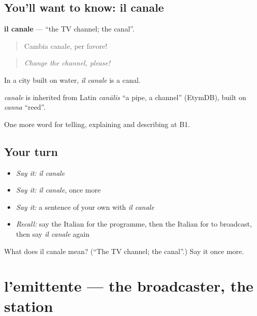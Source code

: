 \subsection*{You'll want to know: il canale}
\textbf{il canale} — \textquotedblleft{}the TV channel; the canal\textquotedblright{}.

\begin{quote}
Cambia canale, per favore!
\end{quote}

\begin{quote}
\emph{Change the channel, please!}
\end{quote}

In a city built on water, \emph{il canale} is a canal.

\begin{cousinweb}
\emph{canale} is inherited from Latin \emph{canālis} \textquotedblleft{}a pipe, a channel\textquotedblright{} (EtymDB), built on \emph{canna} \textquotedblleft{}reed\textquotedblright{}.
\end{cousinweb}

\begin{grammarlens}[title={What you've built}]
One more word for telling, explaining and describing at B1.
\end{grammarlens}

\subsection*{Your turn}
\begin{itemize}
\raggedright
  \item \emph{Say it:} \emph{il canale}
  \item \emph{Say it:} \emph{il canale}, once more
  \item \emph{Say it:} a sentence of your own with \emph{il canale}
  \item \emph{Recall:} say the Italian for the programme, then the Italian for to broadcast, then say \emph{il canale} again
\end{itemize}

\begin{tcolorbox}[breakable,colback=teal!4,colframe=teal!35!black,title={Before you move on}]
What does il canale mean? (\textquotedblleft{}The TV channel; the canal\textquotedblright{}.) Say it once more.
\end{tcolorbox}
\section[l'emittente]{l'emittente — the broadcaster, the station}

